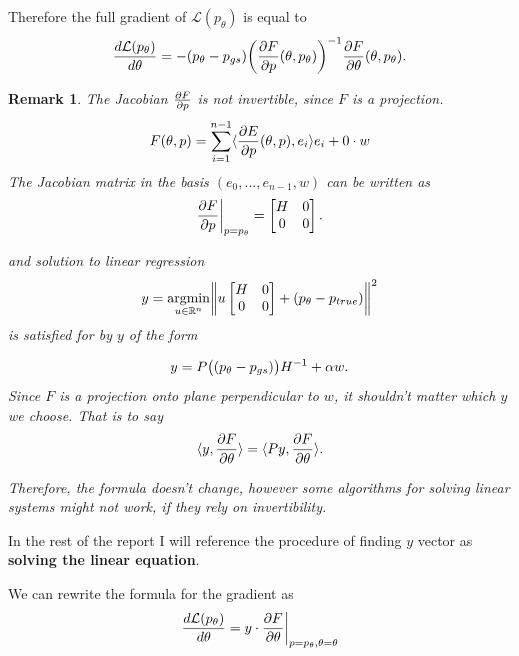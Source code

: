 \documentclass[a4paper,10pt]{report}
\newtheorem{remark}{Remark}
\begin{document}
Therefore the full gradient of $\mathcal{L}(p_\theta)$ is equal to
\begin{equation}
 \frac{d\mathcal{L}(p_\theta)}{d \theta} = - (p_\theta - p_{gs})\bigg(\frac{\partial F}{\partial p}(\theta,p_\theta)\bigg)^{-1} \frac{\partial F}{\partial \theta}(\theta,p_\theta).
\end{equation}
 \begin{remark}
 The Jacobian $\frac{\partial F}{\partial p}$ is not invertible, since $F$ is a projection.
  \begin{equation}
   F(\theta, p) = \sum_{i=1}^{n-1} \langle \frac{\partial E}{\partial p}(\theta, p), e_i \rangle e_i +  0 \cdot w
  \end{equation}
%
 The Jacobian matrix in the basis $(e_0,...,e_{n-1},w)$ can be written as \begin{equation}
                      \frac{\partial F}{\partial p}\bigg|_{p=p_\theta} =\begin{bmatrix}
H & 0 \\
0 & 0
\end{bmatrix}.
\end{equation}

and solution to linear regression
\begin{equation}
 y = \underset{u\in \mathbb{R}^n}{\mathrm{argmin }}\bigg\|u \begin{bmatrix}
H & 0 \\
0 & 0
\end{bmatrix} + (p_\theta-p_{true})\bigg\|^2
\end{equation}
is satisfied for by $y$ of the form

\begin{equation}
 y = P\big((p_\theta-p_{gs})\big)H^{-1} + \alpha w.
\end{equation}
Since $F$ is a projection onto plane perpendicular to $w$, it shouldn't matter which $y$ we choose.
That is to say
\begin{equation}
 \langle y,  \frac{\partial F}{\partial \theta} \rangle=\langle Py, \frac{\partial F}{\partial \theta} \rangle.
\end{equation}



Therefore, the formula doesn't change, however some algorithms for solving linear systems might not work, if they rely on invertibility.

\end{remark}
In the rest of the report I will reference the procedure of finding $y$ vector as \textbf{solving the linear equation}.


We can rewrite the formula for the gradient as
\begin{equation}
 \frac{d\mathcal{L}(p_\theta)}{d \theta} = y \cdot  \frac{\partial F}{\partial \theta}\bigg|_{p=p_\theta, \theta=\theta}
\end{equation}
\end{document}
